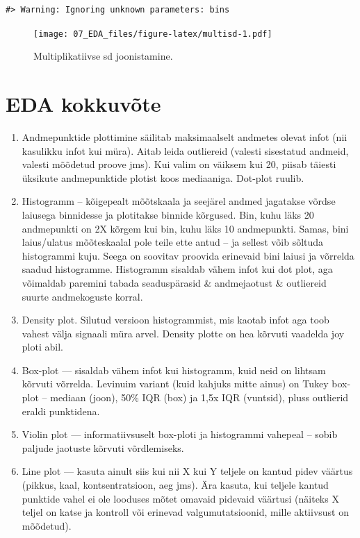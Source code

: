 \documentclass[]{book}
\begin{document}
\begin{verbatim}
#> Warning: Ignoring unknown parameters: bins
\end{verbatim}

\begin{figure}
\centering
\texttt{[image: 07\_EDA\_files/figure-latex/multisd-1.pdf]}
\caption{\label{fig:multisd}Multiplikatiivse sd joonistamine.}
\end{figure}

\hypertarget{eda-kokkuvote}{%
\section{EDA kokkuvõte}\label{eda-kokkuvote}}

\begin{enumerate}
\def\labelenumi{\arabic{enumi}.}
\item
  Andmepunktide plottimine säilitab maksimaalselt andmetes olevat infot (nii kasulikku infot kui müra). Aitab leida outliereid (valesti sisestatud andmeid, valesti mõõdetud proove jms). Kui valim on väiksem kui 20, piisab täiesti üksikute andmepunktide plotist koos mediaaniga. Dot-plot ruulib.
\item
  Histogramm -- kõigepealt mõõtskaala ja seejärel andmed jagatakse võrdse laiusega binnidesse ja plotitakse binnide kõrgused. Bin, kuhu läks 20 andmepunkti on 2X kõrgem kui bin, kuhu läks 10 andmepunkti. Samas, bini laius/ulatus mõõteskaalal pole teile ette antud -- ja sellest võib sõltuda histogrammi kuju. Seega on soovitav proovida erinevaid bini laiusi ja võrrelda saadud histogramme. Histogramm sisaldab vähem infot kui dot plot, aga võimaldab paremini tabada seaduspärasid \& andmejaotust \& outliereid suurte andmekoguste korral.
\item
  Density plot. Silutud versioon histogrammist, mis kaotab infot aga toob vahest välja signaali müra arvel. Density plotte on hea kõrvuti vaadelda joy ploti abil.
\item
  Box-plot --- sisaldab vähem infot kui histogramm, kuid neid on lihtsam kõrvuti võrrelda. Levinuim variant (kuid kahjuks mitte ainus) on Tukey box-plot -- mediaan (joon), 50\% IQR (box) ja 1,5x IQR (vuntsid), pluss outlierid eraldi punktidena.
\item
  Violin plot --- informatiivsuselt box-ploti ja histogrammi vahepeal -- sobib paljude jaotuste kõrvuti võrdlemiseks.
\item
  Line plot --- kasuta ainult siis kui nii X kui Y teljele on kantud pidev väärtus (pikkus, kaal, kontsentratsioon, aeg jms). Ära kasuta, kui teljele kantud punktide vahel ei ole looduses mõtet omavaid pidevaid väärtusi (näiteks X teljel on katse ja kontroll või erinevad valgumutatsioonid, mille aktiivsust on mõõdetud).

\end{enumerate}
\end{document}
